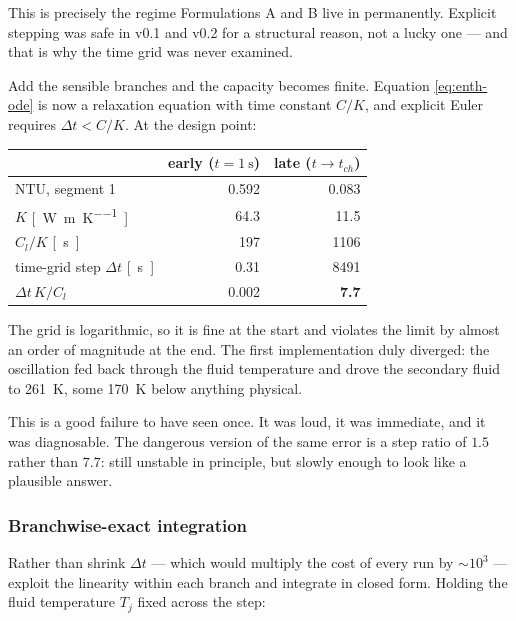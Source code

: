 This is precisely the regime Formulations A and B live in permanently. Explicit
stepping was safe in v0.1 and v0.2 for a structural reason, not a lucky one ---
and that is why the time grid was never examined.

Add the sensible branches and the capacity becomes finite. Equation
\eqref{eq:enth-ode} is now a relaxation equation with time constant $C/K$, and
explicit Euler requires $\Delta t < C/K$. At the design point:

\begin{center}
\begin{tabular}{@{}l r r@{}}
\toprule
 & early ($t=\SI{1}{\second}$) & late ($t\to t_{ch}$) \\
\midrule
$\mathrm{NTU}$, segment 1        & \num{0.592}  & \num{0.083} \\
$K$ \si{[\watt\per\meter\per\kelvin]} & \num{64.3} & \num{11.5} \\
$C_{l}/K$ \si{[\second]}         & \num{197}    & \num{1106}  \\
time-grid step $\Delta t$ \si{[\second]} & \num{0.31} & \num{8491} \\
\midrule
$\Delta t\,K/C_{l}$              & \num{0.002}  & \textbf{\num{7.7}} \\
\bottomrule
\end{tabular}
\end{center}

\noindent
The grid is logarithmic, so it is fine at the start and violates the limit by
almost an order of magnitude at the end. The first implementation duly
diverged: the oscillation fed back through the fluid temperature and drove the
secondary fluid to \SI{261}{\kelvin}, some \SI{170}{\kelvin} below anything
physical.

This is a good failure to have seen once. It was loud, it was immediate, and it
was diagnosable. The dangerous version of the same error is a step ratio of
$1.5$ rather than $7.7$: still unstable in principle, but slowly enough to look
like a plausible answer.

\subsubsection{Branchwise-exact integration}

Rather than shrink $\Delta t$ --- which would multiply the cost of every run by
$\sim\!10^{3}$ --- exploit the linearity within each branch and integrate in
closed form. Holding the fluid temperature $T_{j}$ fixed across the step:

